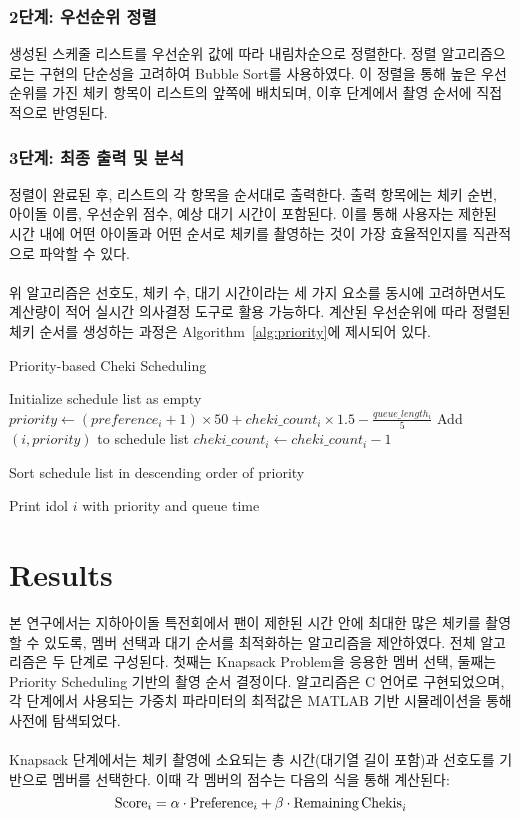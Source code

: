\documentclass[12pt,hidelinks]{article}
\begin{document}
\subsubsection{2단계: 우선순위 정렬}
생성된 스케줄 리스트를 우선순위 값에 따라 내림차순으로 정렬한다. 정렬 알고리즘으로는 구현의 단순성을 고려하여 Bubble Sort를 사용하였다. 이 정렬을 통해 높은 우선순위를 가진 체키 항목이 리스트의 앞쪽에 배치되며, 이후 단계에서 촬영 순서에 직접적으로 반영된다.

\subsubsection{3단계: 최종 출력 및 분석}
정렬이 완료된 후, 리스트의 각 항목을 순서대로 출력한다. 출력 항목에는 체키 순번, 아이돌 이름, 우선순위 점수, 예상 대기 시간이 포함된다. 이를 통해 사용자는 제한된 시간 내에 어떤 아이돌과 어떤 순서로 체키를 촬영하는 것이 가장 효율적인지를 직관적으로 파악할 수 있다.
\\
\\
\noindent 위 알고리즘은 선호도, 체키 수, 대기 시간이라는 세 가지 요소를 동시에 고려하면서도 계산량이 적어 실시간 의사결정 도구로 활용 가능하다. 계산된 우선순위에 따라 정렬된 체키 순서를 생성하는 과정은 Algorithm~\ref{alg:priority}에 제시되어 있다.

\begin{algorithm}
\caption{Priority-based Cheki Scheduling}
\label{alg:priority}
\begin{algorithmic}[1]
\STATE Initialize schedule list as empty
		\STATE $priority \gets (preference_i +1) \times 50 + cheki\_count_i \times 1.5 - \frac{queue\_length_i}{5}$
		\STATE Add $(i, priority)$ to schedule list
		\STATE $cheki\_count_i \gets cheki\_count_i - 1$
	\ENDFOR
\ENDFOR

\STATE Sort schedule list in descending order of priority

	\STATE Print idol $i$ with priority and queue time
\ENDFOR
\end{algorithmic}
\end{algorithm}

\section{Results}
본 연구에서는 지하아이돌 특전회에서 팬이 제한된 시간 안에 최대한 많은 체키를 촬영할 수 있도록, 멤버 선택과 대기 순서를 최적화하는 알고리즘을 제안하였다. 전체 알고리즘은 두 단계로 구성된다. 첫째는 Knapsack Problem을 응용한 멤버 선택, 둘째는 Priority Scheduling 기반의 촬영 순서 결정이다. 알고리즘은  C 언어로 구현되었으며, 각 단계에서 사용되는 가중치 파라미터의 최적값은 MATLAB 기반 시뮬레이션을 통해 사전에 탐색되었다.
\\
\\
Knapsack 단계에서는 체키 촬영에 소요되는 총 시간(대기열 길이 포함)과 선호도를 기반으로 멤버를 선택한다. 이때 각 멤버의 점수는 다음의 식을 통해 계산된다:
\[
\text{Score}_i = \alpha \cdot \text{Preference}_i + \beta \cdot \text{Remaining\,Chekis}_i
\]
\end{document}

